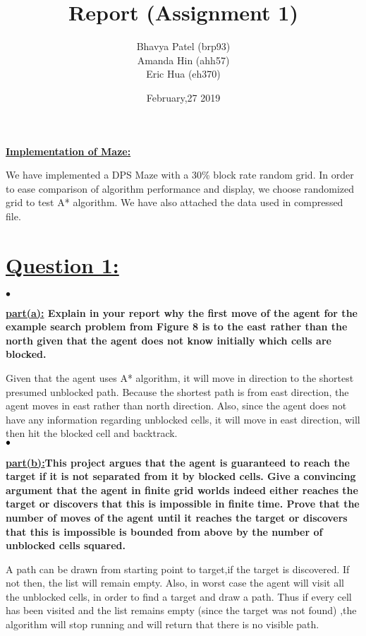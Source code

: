 \documentclass{article}
\title{Report (Assignment 1)}
\author{Bhavya Patel (brp93) 
\\Amanda Hin (ahh57)
\\Eric Hua (eh370)}
\date{February,27 2019}
\begin{document}
\maketitle
{\Large \textbf{\underline{Implementation of Maze:}}\\\par}
{\large We have implemented a DPS Maze with a 30\% block rate random grid. In order to ease comparison of algorithm performance and display, we choose randomized grid to test A* algorithm. We have also attached the data used in compressed file.} 

\section{\underline{Question 1:}}
$\bullet$ {\large \textbf{\underline{part(a):} Explain in your report why the first move of the agent for the example search problem from Figure 8 is to the east rather than the north given that the agent does not know initially which cells are blocked.}\\\par}
{\large Given that the agent uses A* algorithm, it will move in direction to the shortest presumed unblocked path. Because the shortest path is from east direction, the agent moves in east rather than north direction. Also, since the agent does not have any information regarding unblocked cells, it will move in east direction, will then hit the blocked cell and backtrack.}\\
$\\\bullet$ {\large \textbf{\underline{part(b):}This project argues that the agent is guaranteed to reach the target if it is not separated from it by blocked cells. Give a convincing argument that the agent in finite grid worlds indeed either reaches the target or discovers that this is impossible in finite time. Prove that the number of moves of the agent until it reaches the target or discovers that this is impossible is bounded from above by the number of unblocked cells squared.}\\\par}
{\large A path can be drawn from starting point to target,if the target is discovered. If not then, the list will remain empty. Also, in worst case the agent will visit all the unblocked cells, in order to find a target and draw a path. Thus if every cell has been visited and the list remains empty (since the target was not found) ,the algorithm will stop running and will return that there is no visible path.}
\end{document}
